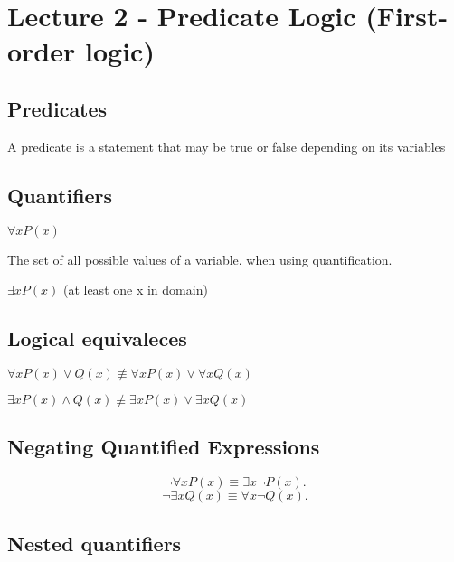 \documentclass[../main.tex]{subfile}
\begin{document}
\section{Lecture 2 - Predicate Logic (First-order logic)}
\subsection{Predicates}
\begin{definition}[Predicate] A predicate is a statement that may be true or false depending on its variables
\end{definition}
\subsection{Quantifiers}
\begin{definition} $\forall x P(x)$
\end{definition}
\begin{definition}[Domain]
	The set of all possible values of a variable.  when using quantification.	
\end{definition}
\begin{definition} $\exists  x P(x)$ (at least one x in domain)
	
\end{definition}
\subsection{Logical equivaleces}
\begin{fact} 
$\forall x P(x) \lor Q(x) \not\equiv \forall x P(x) \lor \forall x Q(x) $	
\end{fact}
\begin{fact} 
$\exists  x P(x) \land Q(x) \not\equiv \exists  x P(x) \lor \exists  x Q(x) $	
\end{fact}

\subsection{Negating Quantified Expressions}
\[
\neg \forall x P(x) \equiv \exists x \neg P(x)
.\] 
\[
\neg \exists x Q(x) \equiv \forall x \neg Q(x)
.\] 
\subsection{Nested quantifiers}
\end{document}
